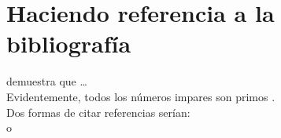 \documentclass[12pt]{article}
\begin{document}
\newpage

\section{Haciendo referencia a la bibliografía}

\citet{Brooks1997Methodology}
demuestra que \ldots\\

Evidentemente, todos los números impares son primos \citep{Jacobson1999Towards}.\\

Dos formas de citar referencias serían:\\
\citep{Smith1990Enabling} o \citet{Smith1990Enabling}



\end{document}
